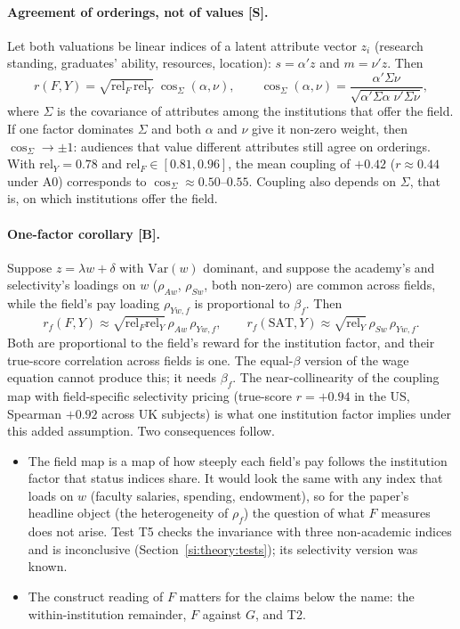 \documentclass[11pt]{article}
\begin{document}
\paragraph{Agreement of orderings, not of values [S].} Let both valuations be linear indices of a latent
attribute vector $z_i$ (research standing, graduates' ability, resources, location): $s=\alpha'z$ and $m=\nu'z$.
Then
\[
r(F,Y)=\sqrt{\mathrm{rel}_F\,\mathrm{rel}_Y}\;\cos_\Sigma(\alpha,\nu),\qquad
\cos_\Sigma(\alpha,\nu)=\frac{\alpha'\Sigma\nu}{\sqrt{\alpha'\Sigma\alpha\;\nu'\Sigma\nu}} ,
\]
where $\Sigma$ is the covariance of attributes among the institutions that offer the field. If one factor dominates
$\Sigma$ and both $\alpha$ and $\nu$ give it non-zero weight, then $\cos_\Sigma\to\pm1$: audiences that value
different attributes still agree on orderings. With $\mathrm{rel}_Y=0.78$ and $\mathrm{rel}_F\in[0.81,0.96]$, the
mean coupling of $+0.42$ ($r\approx0.44$ under A0) corresponds to $\cos_\Sigma\approx0.50$--$0.55$. Coupling also
depends on $\Sigma$, that is, on which institutions offer the field.

\paragraph{One-factor corollary [B].} Suppose $z=\lambda w+\delta$ with $\mathrm{Var}(w)$ dominant, and suppose the
academy's and selectivity's loadings on $w$ ($\rho_{Aw}$, $\rho_{Sw}$, both non-zero) are common across fields,
while the field's pay loading $\rho_{Yw,f}$ is proportional to $\beta_f$. Then
\[
r_f(F,Y)\approx\sqrt{\mathrm{rel}_F\mathrm{rel}_Y}\,\rho_{Aw}\,\rho_{Yw,f},\qquad
r_f(\text{SAT},Y)\approx\sqrt{\mathrm{rel}_Y}\,\rho_{Sw}\,\rho_{Yw,f}.
\]
Both are proportional to the field's reward for the institution factor, and their true-score correlation across
fields is one. The equal-$\beta$ version of the wage equation cannot produce this; it needs $\beta_f$. The
near-collinearity of the coupling map with field-specific selectivity pricing (true-score $r=+0.94$ in the US,
Spearman $+0.92$ across UK subjects) is what one institution factor implies under this added assumption. Two
consequences follow.
\begin{itemize}
\item The field map is a map of how steeply each field's pay follows the institution factor that status indices
share. It would look
the same with any index that loads on $w$ (faculty salaries, spending, endowment), so for the paper's headline object (the heterogeneity of $\rho_f$) the question of what $F$ measures does not arise.
Test T5 checks the invariance with three non-academic indices and is inconclusive (Section~\ref{si:theory:tests});
its selectivity version was known.
\item The construct reading of $F$ matters for the claims below the name: the within-institution remainder, $F$
against $G$, and T2.
\end{itemize}
\end{document}
